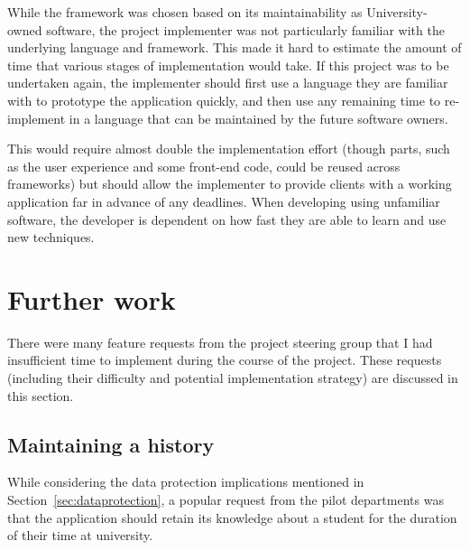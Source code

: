 \documentclass[draft]{scrartcl}
\begin{document}

While the framework was chosen based on its maintainability as
University-owned software, the project implementer was not particularly
familiar with the underlying language and framework. This made it hard to
estimate the amount of time that various stages of implementation would take.
If this project was to be undertaken again, the implementer should first use a
language they are familiar with to prototype the application quickly, and then
use any remaining time to re-implement in a language that can be maintained by
the future software owners.

This would require almost double the implementation effort (though parts, such
as the user experience and some front-end code, could be reused across
frameworks) but should allow the implementer to provide clients with a working
application far in advance of any deadlines. When developing using unfamiliar
software, the developer is dependent on how fast they are able to learn and
use new techniques.





\section{Further work}
\label{sec:furtherwork}



There were many feature requests from the project steering group that I had
insufficient time to implement during the course of the project. These
requests (including their difficulty and potential implementation strategy)
are discussed in this section.

\subsection{Maintaining a history}

While considering the data protection implications mentioned in
Section~\ref{sec:dataprotection}, a popular request from the pilot departments
was that the application should retain its knowledge about a student for the
duration of their time at university.
\end{document}
